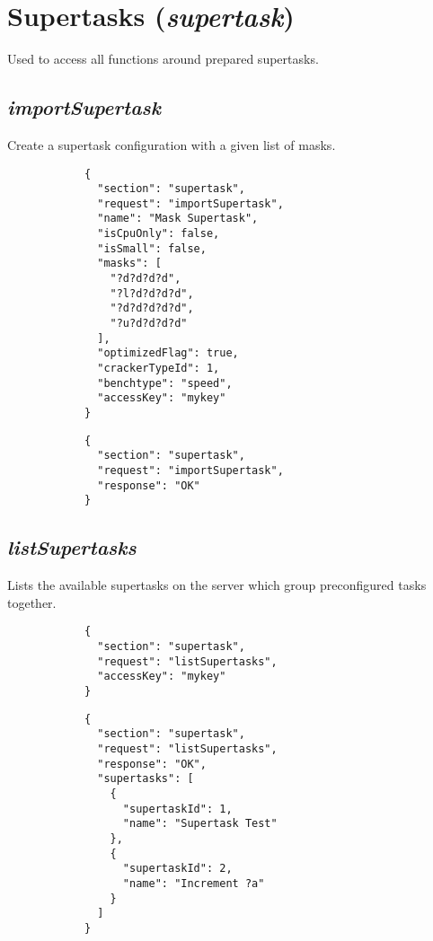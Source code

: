 \section*{Supertasks (\textit{supertask})}
	Used to access all functions around prepared supertasks. 
	\subsection*{\textit{importSupertask}}
		Create a supertask configuration with a given list of masks.
		{
			\color{blue}
			\begin{verbatim}
			{
			  "section": "supertask",
			  "request": "importSupertask",
			  "name": "Mask Supertask",
			  "isCpuOnly": false,
			  "isSmall": false,
			  "masks": [
			    "?d?d?d?d",
			    "?l?d?d?d?d",
			    "?d?d?d?d?d",
			    "?u?d?d?d?d"
			  ],
			  "optimizedFlag": true,
			  "crackerTypeId": 1,
			  "benchtype": "speed",
			  "accessKey": "mykey"
			}
			\end{verbatim}
		}
		{
			\color{OliveGreen}
			\begin{verbatim}
			{
			  "section": "supertask",
			  "request": "importSupertask",
			  "response": "OK"
			}
			\end{verbatim}
		}	
	\subsection*{\textit{listSupertasks}}
		Lists the available supertasks on the server which group preconfigured tasks together.
		{
			\color{blue}
			\begin{verbatim}
			{
			  "section": "supertask",
			  "request": "listSupertasks",
			  "accessKey": "mykey"
			}
			\end{verbatim}
		}
		{
			\color{OliveGreen}
			\begin{verbatim}
			{
			  "section": "supertask",
			  "request": "listSupertasks",
			  "response": "OK",
			  "supertasks": [
			    {
			      "supertaskId": 1,
			      "name": "Supertask Test"
			    },
			    {
			      "supertaskId": 2,
			      "name": "Increment ?a"
			    }
			  ]
			}
			\end{verbatim}
		}
